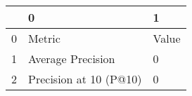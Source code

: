 \begin{tabular}{lll}
\toprule
{} &                       0 &      1 \\
\midrule
0 &                  Metric &  Value \\
1 &       Average Precision &      0 \\
2 &  Precision at 10 (P@10) &      0 \\
\bottomrule
\end{tabular}
